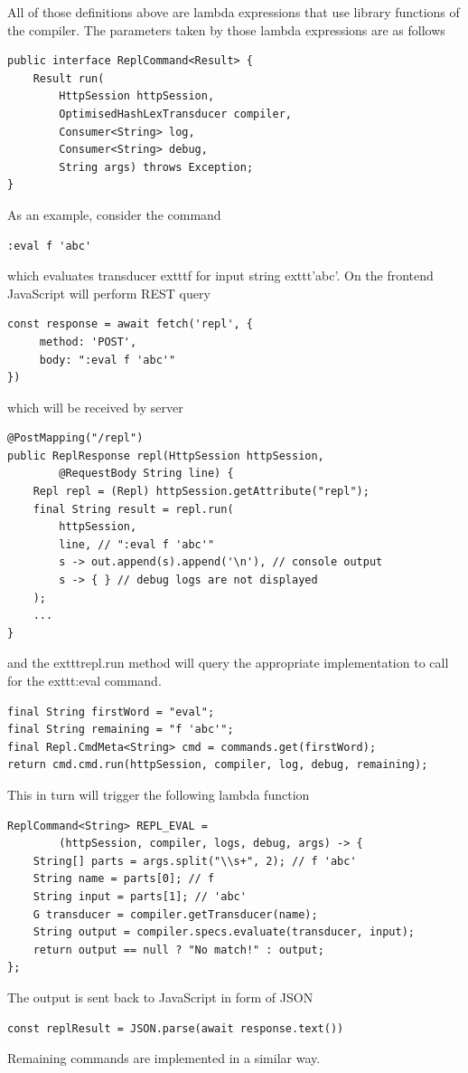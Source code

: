 All of those definitions above are lambda expressions that use library functions
of the compiler. The parameters taken by those lambda expressions are as follows
\begin{lstlisting}
public interface ReplCommand<Result> {
    Result run(
        HttpSession httpSession, 
        OptimisedHashLexTransducer compiler, 
        Consumer<String> log, 
        Consumer<String> debug, 
        String args) throws Exception;
}
\end{lstlisting}
As an example, consider the command 
\begin{lstlisting}
:eval f 'abc'
\end{lstlisting}
which evaluates transducer     exttt{f} for input string     exttt{'abc'}. 
On the frontend JavaScript will perform REST query
\begin{lstlisting}
const response = await fetch('repl', {
     method: 'POST',
     body: ":eval f 'abc'"
})
\end{lstlisting}
which will be received by server
\begin{lstlisting}
@PostMapping("/repl")
public ReplResponse repl(HttpSession httpSession, 
        @RequestBody String line) {
    Repl repl = (Repl) httpSession.getAttribute("repl");
    final String result = repl.run(
        httpSession, 
        line, // ":eval f 'abc'"
        s -> out.append(s).append('\n'), // console output
        s -> { } // debug logs are not displayed
    );
    ...
}
\end{lstlisting}
and the     exttt{repl.run} method will query the appropriate implementation to call for
the     exttt{:eval} command.
\begin{lstlisting}     
final String firstWord = "eval";
final String remaining = "f 'abc'";
final Repl.CmdMeta<String> cmd = commands.get(firstWord);
return cmd.cmd.run(httpSession, compiler, log, debug, remaining);
\end{lstlisting}
This in turn will trigger the following lambda function
\begin{lstlisting}
ReplCommand<String> REPL_EVAL = 
        (httpSession, compiler, logs, debug, args) -> {
    String[] parts = args.split("\\s+", 2); // f 'abc'
    String name = parts[0]; // f
    String input = parts[1]; // 'abc'
    G transducer = compiler.getTransducer(name);
    String output = compiler.specs.evaluate(transducer, input);
    return output == null ? "No match!" : output;
};
\end{lstlisting}
The output is sent back to JavaScript in form of JSON
\begin{lstlisting}
const replResult = JSON.parse(await response.text())
\end{lstlisting}
Remaining commands are implemented in a similar way.

